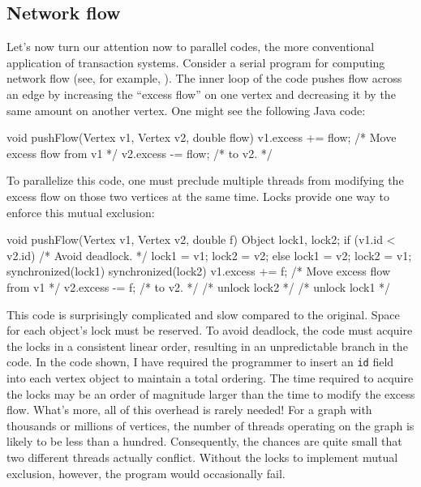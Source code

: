 \subsection{Network flow}\label{sec:flow}

Let's now turn our attention now to parallel codes, the more
conventional application of transaction systems.
Consider a serial program for computing network flow (see, for
example, \cite[Chapter 26]{CormenLeRi01}).  The inner loop of the code
pushes flow across an edge by increasing the ``excess flow'' on one
vertex and decreasing it by the same amount on another vertex.  One
might see the following Java code:
\begin{inlinecode}
void pushFlow(Vertex v1, Vertex v2, double flow) {
  v1.excess += flow; /* Move excess flow from v1 */
  v2.excess -= flow; /* to v2.                   */
}
\end{inlinecode}

To parallelize this code, one must preclude multiple threads from
modifying the excess flow on those two vertices at the same time.
Locks provide one way to enforce this mutual exclusion: 
\begin{inlinecode}
void pushFlow(Vertex v1, Vertex v2, double f) {
  Object lock1, lock2;
  if (v1.id < v2.id) {       /* Avoid deadlock. */
    lock1 = v1; lock2 = v2;
  } else {
    lock1 = v2; lock2 = v1;
  }
  synchronized(lock1) {
    synchronized(lock2) {
      v1.excess += f; /* Move excess flow from v1 */
      v2.excess -= f; /* to v2.                   */
    } /* unlock lock2 */
  } /* unlock lock1 */
}
\end{inlinecode}

This code is surprisingly complicated and slow compared to the
original.  Space for each object's lock must be reserved.
To avoid deadlock, the code must acquire the locks in
a consistent linear order, resulting in an unpredictable branch in the
code.  In the code shown,
I have required the programmer to insert an \texttt{id} field into
each vertex object to maintain a total ordering.
The time required to acquire the locks may be
an order of magnitude larger than the time to
modify the excess flow.
What's more, all of this overhead is rarely
needed!  For a graph with thousands or millions of vertices, the
number of threads operating on the graph is likely to be less than a
hundred.  Consequently, the chances are quite small that two different
threads actually conflict.  Without the locks to implement mutual
exclusion, however, the program would occasionally fail.

